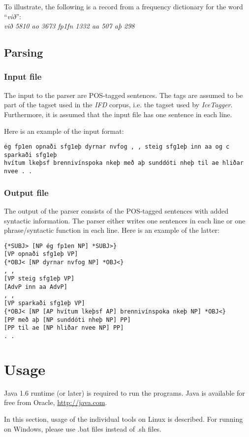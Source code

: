 \documentclass[11pt]{article}
\begin{document}
To illustrate, the following is a record from a frequency dictionary for the word ``\emph{við}'': \\
\emph{við 5810 ao 3673 fp1fn 1332 aa 507 aþ 298}

\subsection{Parsing}
\label{sec:fileFormatParsing}
\subsubsection{Input file}
The input to the parser are POS-tagged sentences.
The tags are assumed to be part of the tagset used in the \emph{IFD} corpus, i.e. the tagset used by \emph{IceTagger}.
Furthermore, it is assumed that the input file has one sentence in each line.

Here is an example of the input format:
\begin{verbatim}
ég fp1en opnaði sfg1eþ dyrnar nvfog , , steig sfg1eþ inn aa og c sparkaði sfg1eþ
hvítum lkeþsf brennivínspoka nkeþ með aþ sunddóti nheþ til ae hliðar nvee . .
\end{verbatim}

\subsubsection{Output file}
The output of the parser consists of the POS-tagged sentences with added syntactic information.
The parser either writes one sentences in each line or one phrase/syntactic function in each line.
Here is an example of the latter:

\begin{verbatim}
{*SUBJ> [NP ég fp1en NP] *SUBJ>}
[VP opnaði sfg1eþ VP]
{*OBJ< [NP dyrnar nvfog NP] *OBJ<}
, ,
[VP steig sfg1eþ VP]
[AdvP inn aa AdvP]
, ,
[VP sparkaði sfg1eþ VP]
{*OBJ< [NP [AP hvítum lkeþsf AP] brennivínspoka nkeþ NP] *OBJ<}
[PP með aþ [NP sunddóti nheþ NP] PP]
[PP til ae [NP hliðar nvee NP] PP]
. .
\end{verbatim}

\section{Usage}
\label{sec:usage}
Java 1.6 runtime (or later) is required to run the programs.
Java is available for free from Oracle, \url{http://java.com}.

In this section, usage of the individual tools on Linux is described. For running on Windows, please use .bat files instead of .sh files.
\end{document}

